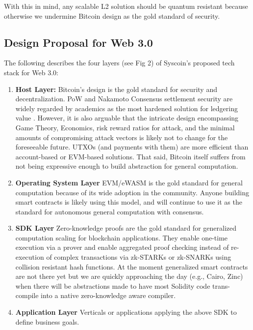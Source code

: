 \documentclass[peerreview]{ieeesyscoin}
\begin{document}
With this in mind, any scalable L2 solution should be quantum resistant because otherwise we undermine Bitcoin design as the gold standard of security.

\subsection{Design Proposal for Web 3.0}

The following describes the four layers (see Fig 2) of Syscoin’s proposed tech stack for Web 3.0:

\begin{enumerate}
\item \textbf{Host Layer:} Bitcoin’s design is the gold standard for security and decentralization. PoW and Nakamoto Consensus settlement security are widely regarded by academics as the most hardened solution for ledgering value \cite{Bit15}. However, it is also arguable that the intricate design encompassing Game Theory, Economics, risk reward ratios for attack, and the minimal amounts of compromising attack vectors is likely not to change for the foreseeable future. UTXOs (and payments with them) are more efficient than account-based or EVM-based solutions. That said, Bitcoin itself suffers from not being expressive enough to build abstraction for general computation. 
\item \textbf{Operating System Layer} EVM/eWASM is the gold standard for general computation because of its wide adoption in the community. Anyone building smart contracts is likely using this model, and will continue to use it as the standard for autonomous general computation with consensus.
\item \textbf{SDK Layer} Zero-knowledge proofs are the gold standard for generalized computation scaling for blockchain applications. They enable one-time execution via a prover and enable aggregated proof checking instead of re-execution of complex transactions via zk-STARKs or zk-SNARKs using collision resistant hash functions. At the moment generalized smart contracts are not there yet but we are quickly approaching the day (e.g., Cairo, Zinc) when there will be abstractions made to have most Solidity code trans-compile into a native zero-knowledge aware compiler.
\item \textbf{Application Layer} Verticals or applications applying the above SDK to define business goals. 
\end{enumerate}
\end{document}
